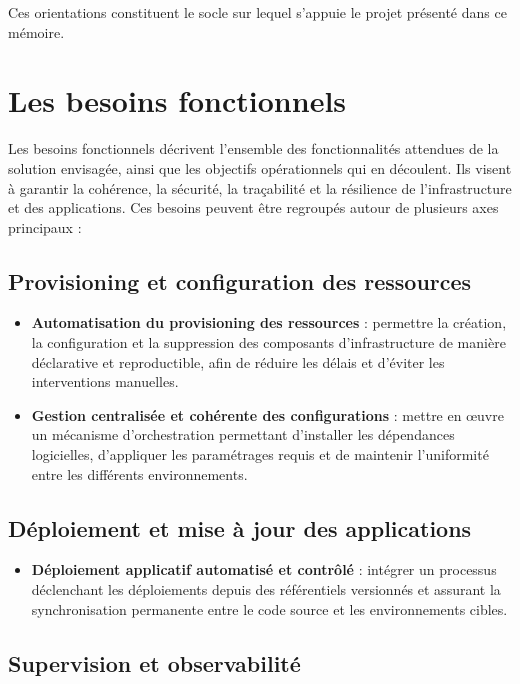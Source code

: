 Ces orientations constituent le socle sur lequel s'appuie le projet présenté dans ce mémoire.

\section{Les besoins fonctionnels}

Les besoins fonctionnels décrivent l'ensemble des fonctionnalités attendues de la solution envisagée, ainsi que les objectifs opérationnels qui en découlent. Ils visent à garantir la cohérence, la sécurité, la traçabilité et la résilience de l'infrastructure et des applications. Ces besoins peuvent être regroupés autour de plusieurs axes principaux :

\subsection*{Provisioning et configuration des ressources}

\begin{itemize}
	\item \textbf{Automatisation du provisioning des ressources} : permettre la création, la configuration et la suppression des composants d'infrastructure de manière déclarative et reproductible, afin de réduire les délais et d'éviter les interventions manuelles.

	\item \textbf{Gestion centralisée et cohérente des configurations} : mettre en œuvre un mécanisme d'orchestration permettant d'installer les dépendances logicielles, d'appliquer les paramétrages requis et de maintenir l'uniformité entre les différents environnements.
\end{itemize}

\subsection*{Déploiement et mise à jour des applications}

\begin{itemize}
	\item \textbf{Déploiement applicatif automatisé et contrôlé} : intégrer un processus déclenchant les déploiements depuis des référentiels versionnés et assurant la synchronisation permanente entre le code source et les environnements cibles.
\end{itemize}

\subsection*{Supervision et observabilité}

